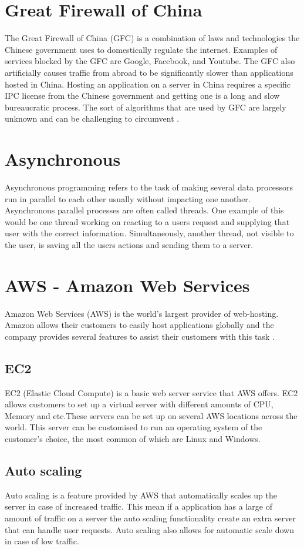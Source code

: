 \section{Great Firewall of China}
The Great Firewall of China (GFC) is a combination of laws and technologies the Chinese government uses to domestically regulate the internet. Examples of services blocked by the GFC are Google, Facebook, and Youtube. The GFC also artificially causes traffic from abroad to be significantly slower than applications hosted in China. Hosting an application on a server in China requires a specific IPC license from the Chinese government and getting one is a long and slow bureaucratic process. The sort of algorithms that are used by GFC are largely unknown and can be challenging to circumvent \cite{GFC}.
\section{Asynchronous}
Asynchronous programming refers to the task of making several data processors run in parallel to each other usually without impacting one another. Asynchronous parallel processes are often called threads. One example of this would be one thread working on reacting to a users request and supplying that user with the correct information. Simultaneously, another thread, not visible to the user, is saving all the users actions and sending them to a server.

\section{AWS - Amazon Web Services}
Amazon Web Services (AWS) is the world's largest provider of web-hosting. Amazon allows their customers to easily host applications globally and the company provides several features to assist their customers with this task \cite{AWS}.
\subsection{EC2}
EC2 (Elastic Cloud Compute) is a basic web server service that AWS offers. EC2 allows customers to set up a virtual server with different amounts of CPU, Memory  and etc.These servers can be set up on several AWS locations across the world. This server can be customised to run an operating system of the customer's choice, the most common of which are Linux and Windows. \cite{AWSDoc}
\subsection{Auto scaling}
Auto scaling is a feature provided by AWS that automatically scales up the server in case of increased traffic. This mean if a application has a large of amount of traffic on a server the auto scaling functionality create an extra server  that can handle user requests. Auto scaling also allows for automatic scale down in case of low traffic. \cite{AWSDoc}

